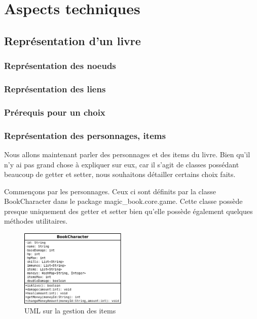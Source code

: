 \chapter{Aspects techniques}

	\section{Représentation d'un livre}
		\label{sec:representation_livre}

		\subsection{Représentation des noeuds}


		\subsection{Représentation des liens}



		\subsection{Prérequis pour un choix}



		\subsection{Représentation des personnages, items}

			Nous allons maintenant parler des personnages et des items du livre. Bien qu'il n'y ai pas grand chose à expliquer sur eux, car il s'agit de classes possédant beaucoup de getter et setter, nous souhaitons détailler certains choix faits.

			Commençons par les personnages. Ceux ci sont définits par la classe BookCharacter dans le package magic\_book.core.game. Cette classe possède presque uniquement des getter et setter bien qu'elle possède également quelques méthodes utilitaires.

			\begin{figure}[H]
				\centering\includegraphics[width=0.45\textwidth, keepaspectratio]{img/book_character.png}
				\caption{UML sur la gestion des items}
			\end{figure}

